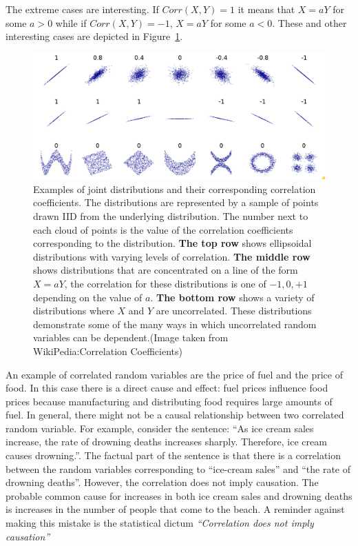 The extreme cases are interesting. If $Corr(X,Y)=1$ it means that
$X=aY$ for some $a>0$ while if $Corr(X,Y)=-1$, $X=aY$ for some
$a<0$. These and other interesting cases are depicted in Figure~\ref{fig:corrCoeff}.

\begin{figure}[tb]
\begin{center}
\includegraphics[width=5in]{figs/correlationCoefficients.png}
\end{center}
\caption{\label{fig:corrCoeff} Examples of joint distributions and
  their corresponding correlation coefficients. The distributions are
  represented by a sample of points drawn IID from the underlying
  distribution. The number next to each cloud of points is the value 
  of the correlation coefficients corresponding to the distribution. 
{\bf The top row} shows ellipsoidal distributions with varying levels of
correlation. {\bf The middle row} shows distributions that are concentrated
on a line of the form $X=aY$, the correlation for these distributions
is one of $-1,0,+1$ depending on the value of $a$. {\bf The bottom
  row} shows a variety of distributions where $X$ and $Y$ are
uncorrelated. These distributions demonstrate some of the many ways in
which uncorrelated random variables can be dependent.(Image taken from
WikiPedia:Correlation Coefficients)}
\end{figure}

An example of correlated random variables are the
price of fuel and the price of food. In this case there is a
direct cause and effect: fuel prices influence food prices because
manufacturing and distributing food requires large amounts of fuel. In
general, there might not be a causal relationship between two
correlated random variable. For example, consider the sentence: ``As
ice cream sales increase, the rate of drowning deaths increases
sharply. Therefore, ice cream causes drowning.''. The factual part of
the sentence is that there is a correlation between the random
variables corresponding to ``ice-cream sales'' and ``the rate of
drowning deaths''. However, the correlation does not imply
causation. The probable common cause for increases in both ice cream sales and
drowning deaths is increases in the number of people that come to the beach.  A
reminder against making this mistake is the statistical dictum
{\em ``Correlation does not imply causation''}

